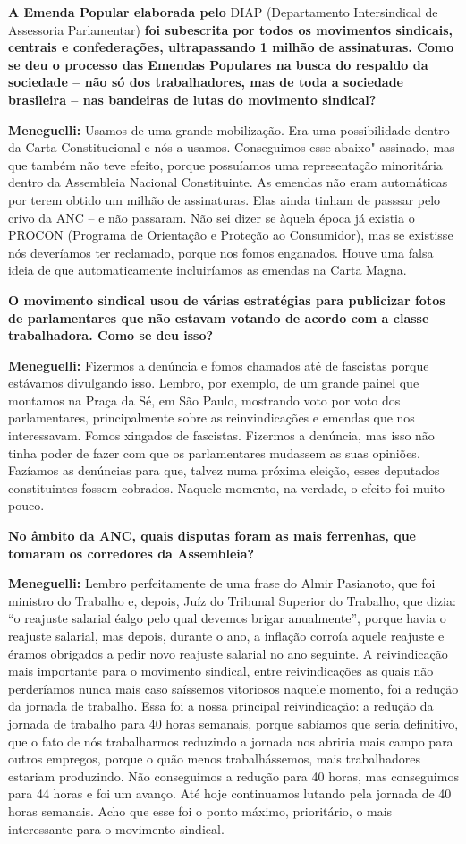 \textbf{A Emenda Popular elaborada pelo} DIAP (Departamento
Intersindical de Assessoria Parlamentar) \textbf{foi subescrita por
todos os movimentos sindicais, centrais e confederações, ultrapassando 1
milhão de assinaturas. Como se deu o processo das Emendas Populares na
busca do respaldo da sociedade -- não só dos trabalhadores, mas de toda
a sociedade brasileira -- nas bandeiras de lutas do movimento sindical?}

\textbf{Meneguelli:} Usamos de uma grande mobilização. Era uma
possibilidade dentro da Carta Constitucional e nós a usamos. Conseguimos
esse abaixo"-assinado, mas que também não teve efeito, porque possuíamos
uma representação minoritária dentro da Assembleia Nacional
Constituinte. As emendas não eram automáticas por terem obtido um milhão
de assinaturas. Elas ainda tinham de passsar pelo crivo da ANC -- e não
passaram. Não sei dizer se àquela época já existia o PROCON (Programa de
Orientação e Proteção ao Consumidor), mas se existisse nós deveríamos
ter reclamado, porque nos fomos enganados. Houve uma falsa ideia de que
automaticamente incluiríamos as emendas na Carta Magna.

\textbf{O movimento sindical usou de várias estratégias para publicizar
fotos de parlamentares que não estavam votando de acordo com a classe
trabalhadora. Como se deu isso?}

\textbf{Meneguelli:} Fizermos a denúncia e fomos chamados até de
fascistas porque estávamos divulgando isso. Lembro, por exemplo, de um
grande painel que montamos na Praça da Sé, em São Paulo, mostrando voto
por voto dos parlamentares, principalmente sobre as reinvindicações e
emendas que nos interessavam. Fomos xingados de fascistas. Fizermos a
denúncia, mas isso não tinha poder de fazer com que os parlamentares
mudassem as suas opiniões. Fazíamos as denúncias para que, talvez numa
próxima eleição, esses deputados constituintes fossem cobrados. Naquele
momento, na verdade, o efeito foi muito pouco.

\textbf{No âmbito da ANC, quais disputas foram as mais ferrenhas, que
tomaram os corredores da Assembleia?}

\textbf{Meneguelli:} Lembro perfeitamente de uma frase do Almir
Pasianoto, que foi ministro do Trabalho e, depois, Juíz do Tribunal
Superior do Trabalho, que dizia: ``o reajuste salarial éalgo pelo qual
devemos brigar anualmente'', porque havia o reajuste salarial, mas
depois, durante o ano, a inflação corroía aquele reajuste e éramos
obrigados a pedir novo reajuste salarial no ano seguinte. A
reivindicação mais importante para o movimento sindical, entre
reivindicações as quais não perderíamos nunca mais caso saíssemos
vitoriosos naquele momento, foi a redução da jornada de trabalho. Essa
foi a nossa principal reivindicação: a redução da jornada de trabalho
para 40 horas semanais, porque sabíamos que seria definitivo, que o fato
de nós trabalharmos reduzindo a jornada nos abriria mais campo para
outros empregos, porque o quão menos trabalhássemos, mais trabalhadores
estariam produzindo. Não conseguimos a redução para 40 horas, mas
conseguimos para 44 horas e foi um avanço. Até hoje continuamos lutando
pela jornada de 40 horas semanais. Acho que esse foi o ponto máximo,
prioritário, o mais interessante para o movimento sindical.

